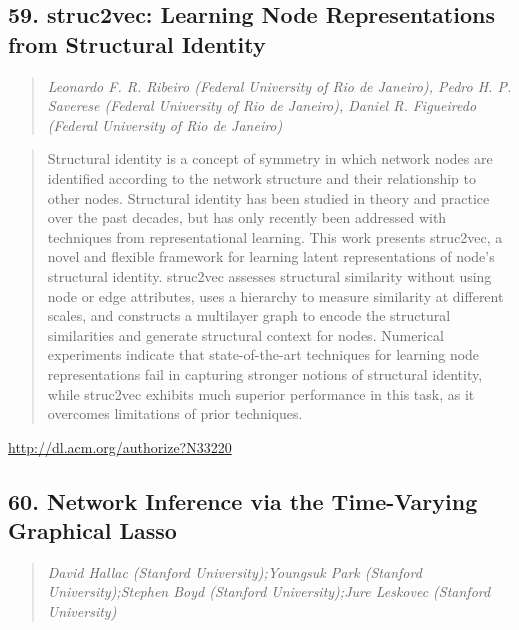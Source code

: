 \documentclass{article}
\begin{document}
\subsection{59. struc2vec: Learning Node Representations from Structural Identity}

\begin{quote}
\footnotesize{\textit{Leonardo F. R. Ribeiro (Federal University of Rio de Janeiro), Pedro H. P. Saverese (Federal University of Rio de Janeiro), Daniel R. Figueiredo (Federal University of Rio de Janeiro)}}

\end{quote}

\begin{quote}
Structural identity is a concept of symmetry in which network nodes are identified according to the network structure and their relationship to other nodes. Structural identity has been studied in theory and practice over the past decades, but has only recently been addressed with techniques from representational learning. This work presents struc2vec, a novel and flexible framework for learning latent representations of node’s structural identity. struc2vec assesses structural similarity without using node or edge attributes, uses a hierarchy to measure similarity at different scales, and constructs a multilayer graph to encode the structural similarities and generate structural context for nodes. Numerical experiments indicate that state-of-the-art techniques for learning node representations fail in capturing stronger notions of structural identity, while struc2vec exhibits much superior performance in this task, as it overcomes limitations of prior techniques.
\end{quote}

\href{http://dl.acm.org/authorize?N33220}{http://dl.acm.org/authorize?N33220}

\subsection{60. Network Inference via the Time-Varying Graphical Lasso}

\begin{quote}
\footnotesize{\textit{David Hallac (Stanford University);Youngsuk Park (Stanford University);Stephen Boyd (Stanford University);Jure Leskovec (Stanford University)}}

\end{quote}
\end{document}
